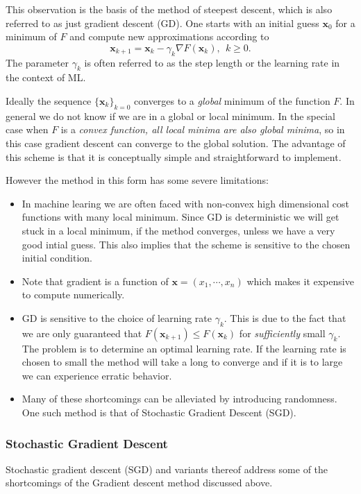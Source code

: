 \documentclass[a4paper, twocolumn]{article}
\begin{document}
This observation is the basis of the method of steepest descent, which is also referred to as just gradient descent (GD). 
One starts with an initial guess $\mathbf{x}_0$ for a minimum of $F$ and compute new approximations according to
\begin{equation}
\mathbf{x}_{k+1} = \mathbf{x}_k - \gamma_k \nabla F(\mathbf{x}_k), \ \ k \geq 0.
\end{equation}
The parameter $\gamma_k$ is often referred to as the step length or the learning rate in the context of ML.

Ideally the sequence $\{ \mathbf{x}_k \}_{k=0}$ converges to a \textit{global} minimum of the function $F$. 
In general we do not know if we are in a global or local minimum.  
In the special case when $F$ is a \textit{convex function, all local minima are also global minima}, so in this case gradient 
descent can converge to the global solution. The advantage of this scheme is that it is conceptually simple and 
straightforward to implement. 

However the method in this form has some severe limitations:

\begin{itemize}
 \item In machine learing we are often faced with non-convex high dimensional cost functions with many local minimum. 
 Since GD is deterministic we will get stuck in a local minimum, if the method converges, unless we have a very good intial 
 guess. This also implies that the scheme is sensitive to the chosen initial condition.
 \item Note that gradient is a function of $\mathbf{x} = (x_1,\cdots,x_n)$ which makes it expensive to compute numerically.
 \item GD is sensitive to the choice of learning rate $\gamma_k$. This is due to the fact that we are only guaranteed 
that $F(\mathbf{x}_{k+1}) \leq F(\mathbf{x}_k)$ for \textit{sufficiently} small $\gamma_k$. The problem is to determine an 
optimal learning rate. If the learning rate is chosen to small the method will take a long to converge and if it is to 
large we can experience erratic behavior.
\item Many of these shortcomings can be alleviated by introducing randomness. One such method is that of Stochastic Gradient Descent 
(SGD).
\end{itemize}

\subsubsection{Stochastic Gradient Descent \label{sect:stochasticgradient}}
Stochastic gradient descent (SGD) and variants thereof address some of the shortcomings of the Gradient descent method discussed above. 
\end{document}
